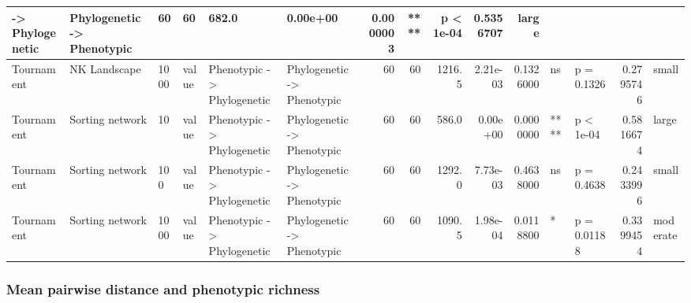 \documentclass[]{book}
\begin{document}
\begin{table}
\begin{tabular}[t]{l|l|l|l|l|l|r|r|r|r|r|l|l|r|l}
    ->
Phylogenetic & Phylogenetic
    ->
Phenotypic & 60 & 60 & 682.0 & 0.00e+00 & 0.0000003 & **** & p < 1e-04 & 0.5356707 & large\\
\hline
Tournament & NK Landscape & 1000 & value & Phenotypic
    ->
Phylogenetic & Phylogenetic
    ->
Phenotypic & 60 & 60 & 1216.5 & 2.21e-03 & 0.1326000 & ns & p = 0.1326 & 0.2795746 & small\\
\hline
Tournament & Sorting network & 10 & value & Phenotypic
    ->
Phylogenetic & Phylogenetic
    ->
Phenotypic & 60 & 60 & 586.0 & 0.00e+00 & 0.0000000 & **** & p < 1e-04 & 0.5816674 & large\\
\hline
Tournament & Sorting network & 100 & value & Phenotypic
    ->
Phylogenetic & Phylogenetic
    ->
Phenotypic & 60 & 60 & 1292.0 & 7.73e-03 & 0.4638000 & ns & p = 0.4638 & 0.2433996 & small\\
\hline
Tournament & Sorting network & 1000 & value & Phenotypic
    ->
Phylogenetic & Phylogenetic
    ->
Phenotypic & 60 & 60 & 1090.5 & 1.98e-04 & 0.0118800 & * & p = 0.01188 & 0.3399454 & moderate\\
\hline
\end{tabular}
\end{table}

\hypertarget{mean-pairwise-distance-and-phenotypic-richness-1}{%
\subsubsection{Mean pairwise distance and phenotypic richness}\label{mean-pairwise-distance-and-phenotypic-richness-1}}
\end{document}
